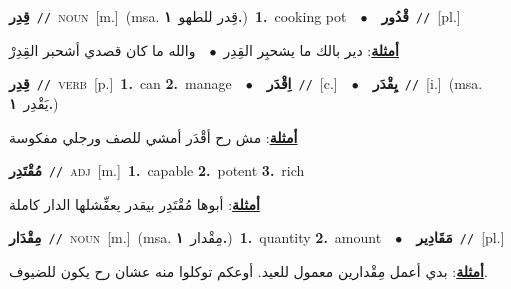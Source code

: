 \documentclass[10pt,a4paper,twoside]{article} %
\begin{document}
\begin{multicols}{2}
{\setlength\topsep{0pt}\textbf{\foreignlanguage{arabic}{قِدِر}}\ {\color{gray}\texttt{//}\color{black}}\ \textsc{noun}\ [m.]\ \color{gray}(msa. \foreignlanguage{arabic}{قِدر للطهو}~\foreignlanguage{arabic}{\textbf{١.}})\color{black}\ \textbf{1.}~cooking pot\ \ $\bullet$\ \ \setlength\topsep{0pt}\textbf{\foreignlanguage{arabic}{قْدُور}}\ {\color{gray}\texttt{//}\color{black}}\ [pl.]\  \begin{flushright}\color{gray}\foreignlanguage{arabic}{\textbf{\underline{\foreignlanguage{arabic}{أمثلة}}}: دير بالك ما يشحبِر القِدِر\ $\bullet$\ \  والله ما كان قصدي أشحبر القِدِرْ}\end{flushright}\color{black}} \vspace{2mm}

{\setlength\topsep{0pt}\textbf{\foreignlanguage{arabic}{قِدِر}}\ {\color{gray}\texttt{//}\color{black}}\ \textsc{verb}\ [p.]\ \textbf{1.}~can  \textbf{2.}~manage\ \ $\bullet$\ \ \setlength\topsep{0pt}\textbf{\foreignlanguage{arabic}{اِقْدَر}}\ {\color{gray}\texttt{//}\color{black}}\ [c.]\ \ $\bullet$\ \ \setlength\topsep{0pt}\textbf{\foreignlanguage{arabic}{يِقْدَر}}\ {\color{gray}\texttt{//}\color{black}}\ [i.]\ \color{gray}(msa. \foreignlanguage{arabic}{يَقْدِر}~\foreignlanguage{arabic}{\textbf{١.}})\color{black}\  \begin{flushright}\color{gray}\foreignlanguage{arabic}{\textbf{\underline{\foreignlanguage{arabic}{أمثلة}}}: مش رح أقْدَر أمشي للصف ورجلي مفكوسة}\end{flushright}\color{black}} \vspace{2mm}

{\setlength\topsep{0pt}\textbf{\foreignlanguage{arabic}{مُقْتَدِر}}\ {\color{gray}\texttt{//}\color{black}}\ \textsc{adj}\ [m.]\ \textbf{1.}~capable  \textbf{2.}~potent  \textbf{3.}~rich\  \begin{flushright}\color{gray}\foreignlanguage{arabic}{\textbf{\underline{\foreignlanguage{arabic}{أمثلة}}}: أبوها مُقْتَدِر بيقدر يعفِّشلها الدار كاملة}\end{flushright}\color{black}} \vspace{2mm}

{\setlength\topsep{0pt}\textbf{\foreignlanguage{arabic}{مِقْدَار}}\ {\color{gray}\texttt{//}\color{black}}\ \textsc{noun}\ [m.]\ \color{gray}(msa. \foreignlanguage{arabic}{مِقْدار}~\foreignlanguage{arabic}{\textbf{١.}})\color{black}\ \textbf{1.}~quantity  \textbf{2.}~amount\ \ $\bullet$\ \ \setlength\topsep{0pt}\textbf{\foreignlanguage{arabic}{مَقَادِير}}\ {\color{gray}\texttt{//}\color{black}}\ [pl.]\  \begin{flushright}\color{gray}\foreignlanguage{arabic}{\textbf{\underline{\foreignlanguage{arabic}{أمثلة}}}: بدي أعمل مِقْدارين معمول للعيد. أوعكم توكلوا منه عشان رح يكون للضيوف.}\end{flushright}\color{black}} \vspace{2mm}


\end{multicols}
\end{document}

